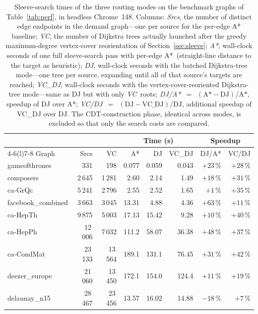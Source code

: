 \documentclass[a4paper,USenglish,anonymous]{gd-lipics-v3}
\begin{document}
\begin{table}[t]
  \centering
  \scriptsize
  \setlength{\tabcolsep}{4.5pt}
  \begin{tabular}{@{}lrrrrrrr@{}}
    \toprule
    & & & \multicolumn{3}{c}{Time (s)} & \multicolumn{2}{c}{Speedup} \\
    \cmidrule(lr){4-6}\cmidrule(l){7-8}
    Graph & Srcs & VC & A* & DJ & VC\_DJ & DJ/A* & VC/DJ \\
    \midrule
    gameofthrones      &     331 &     198 &   0.077 &   0.059 &   0.043 & $+23$\,\% & $+28$\,\% \\
    composers          &  2\,645 &  1\,281 &   2.60  &   2.14  &   1.49  & $+18$\,\% & $+31$\,\% \\
    ca-GrQc            &  5\,241 &  2\,796 &   2.55  &   2.52  &   1.65  &  $+1$\,\% & $+35$\,\% \\
    facebook\_combined &  3\,663 &  3\,045 &  13.31  &   4.88  &   4.36  & $+63$\,\% & $+11$\,\% \\
    ca-HepTh           &  9\,875 &  5\,003 &  17.13  &  15.42  &   9.28  & $+10$\,\% & $+40$\,\% \\
    ca-HepPh           & 12\,006 &  7\,032 & 111.2   &  58.07  &  36.38  & $+48$\,\% & $+37$\,\% \\
    ca-CondMat         & 23\,133 & 13\,564 & 189.1   & 131.1   &  76.45  & $+31$\,\% & $+42$\,\% \\
    deezer\_europe     & 21\,060 & 13\,450 & 172.1   & 154.0   & 124.4   & $+11$\,\% & $+19$\,\% \\
    delaunay\_n15      & 28\,467 & 23\,456 &  13.57  &  16.02  &  14.88  & $-18$\,\% &  $+7$\,\% \\
    \bottomrule
  \end{tabular}
  \caption{Sleeve-search times of the three routing modes on the
    benchmark graphs of Table~\ref{tab:perf}, in headless
    Chrome~148. Columns: \emph{Srcs}, the number of distinct edge
    endpoints in the demand graph---one per source for the per-edge
    A* baseline; \emph{VC}, the number of Dijkstra trees actually
    launched after the greedy maximum-degree vertex-cover
    reorientation of Section~\ref{sec:sleeve}; \emph{A*}, wall-clock
    seconds of one full sleeve-search pass with per-edge A*\
    (straight-line distance to the target as heuristic);
    \emph{DJ}, wall-clock seconds with the batched Dijkstra-tree
    mode---one tree per source, expanding until all of that source's
    targets are reached; \emph{VC\_DJ}, wall-clock seconds with the
    vertex-cover-reoriented Dijkstra-tree mode---same as DJ but with
    only \emph{VC}~roots; \emph{DJ/A*}~$=$~$(\text{A*}-\text{DJ})/\text{A*}$,
    speedup of DJ over A*; \emph{VC/DJ}~$=$~$(\text{DJ}-\text{VC\_DJ})/\text{DJ}$,
    additional speedup of VC\_DJ over DJ. The CDT-construction phase,
    identical across modes, is excluded so that only the search costs
    are compared.}
  \label{tab:routing-modes}
\end{table}
\end{document}
